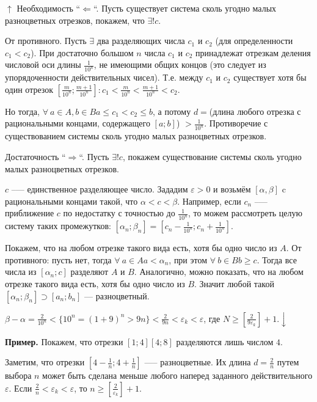 \documentclass{article}
\begin{document}
        $\uparrow$ Необходимость ``$\Leftarrow$``. Пусть существует система сколь угодно малых разноцветных отрезков, покажем, что $\exists! c$. 

        От противного. Пусть $\exists$ два разделяющих числа $c_1$ и $c_2$ (для определенности $c_1 < c_2$). При достаточно большом $n$ числа $c_1$ и $c_2$ принадлежат отрезкам деления числовой оси длины $\frac{1}{10^n}$, не имеющими общих концов (это следует из упорядоченности действительных чисел). Т.е. между $c_1$ и $c_2$ существует хотя бы один отрезок $[\frac{m}{10^n}; \frac{m + 1}{10^n}]: c_1 < \frac{m}{10^n} < \frac{m + 1}{10^n} < c_2$.
        
        Но тогда, $\forall\ a \in A, b \in B a \leq c_1 < c_2 \leq b$, а потому $d = $(длина любого отрезка с рациональными концами, содержащего $[a; b]$) $> \frac{1}{10^n}$. Противоречие с существованием системы сколь угодно малых разноцветных отрезков.

        Достаточность ``$\Rightarrow$``. Пусть $\exists! c$, покажем существование системы сколь угодно малых разноцветных отрезков.

        $c$ --— единственное разделяющее число. Зададим $\varepsilon > 0$ и возьмём $[\alpha, \beta]$ c рациональными концами такой, что $\alpha < c < \beta$. Например, если $c_n$ --— приближение $c$ по недостатку с точностью до $\frac{1}{10^n}$, то можем рассмотреть целую систему таких промежутков: $[\alpha_n; \beta_n] = [c_n - \frac{1}{10^n}; c_n + \frac{1}{10^n}]$. 

        Покажем, что на любом отрезке такого вида есть, хотя бы одно число из $A$. От противного: пусть нет, тогда $\forall\ a \in A a < \alpha_n$, при этом $\forall\ b \in B b \geq c$. Тогда все числа из $[\alpha_n; c]$ разделяют $A$ и $B$. Аналогично, можно показать, что на любом отрезке такого вида есть, хотя бы одно число из $B$. Значит любой такой $[\alpha_n; \beta_n] \supset [a_n; b_n]$ --- разноцветный.

        $\beta - \alpha = \frac{2}{10^n} < \{10^n = (1 + 9)^n > 9n\} < \frac{2}{9n} < \varepsilon_k < \varepsilon$, где $N \geq [\frac{2}{9 \varepsilon_k}] + 1. \downarrow$ 

        \textbf{Пример.} Покажем, что отрезки $[1; 4] [4; 8]$ разделяются лишь числом $4$.
        
        Заметим, что отрезки $[4 - \frac{1}{n}; 4 + \frac{1}{n}]$ —-- разноцветные. Их длина $d = \frac{2}{n}$ путем выбора $n$ может быть сделана меньше любого наперед заданного действительного $\varepsilon$. Если $\frac{2}{n} < \varepsilon_k < \varepsilon$, то $n \geq [\frac{2}{\varepsilon_k}] + 1$. 
\end{document}
